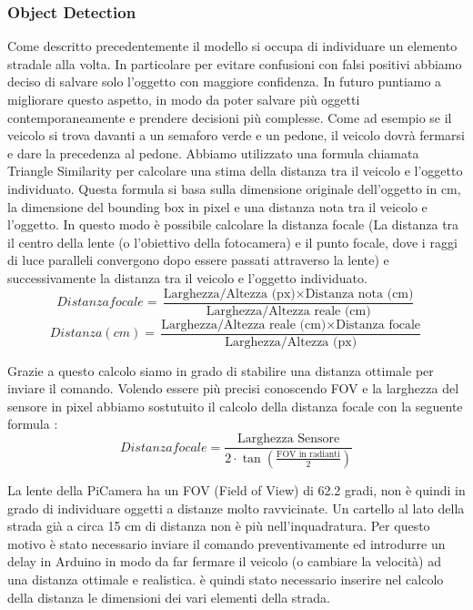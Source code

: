 \documentclass{article}
\begin{document}
    \subsubsection{Object Detection}
    Come descritto precedentemente il modello si occupa di individuare un elemento stradale alla volta. In particolare per evitare confusioni con falsi positivi abbiamo deciso di salvare solo l'oggetto con maggiore confidenza. In futuro puntiamo a migliorare questo aspetto, in modo da poter salvare più oggetti contemporaneamente e prendere decisioni più complesse. Come ad esempio se il veicolo si trova davanti a un semaforo verde e un pedone, il veicolo dovrà fermarsi e dare la precedenza al pedone.
    Abbiamo utilizzato una formula chiamata \cite{distanza} Triangle Similarity per calcolare una stima della distanza tra il veicolo e l'oggetto individuato. Questa formula si basa sulla dimensione originale dell'oggetto in cm, la dimensione del bounding box in pixel e una distanza nota tra il veicolo e l'oggetto. In questo modo è possibile calcolare la distanza focale (La distanza tra il centro della lente (o l'obiettivo della fotocamera) e il punto focale, dove i raggi di luce paralleli convergono dopo essere passati attraverso la lente) e successivamente la distanza tra il veicolo e l'oggetto individuato.  
    \[
    Distanza focale = \frac{\text{Larghezza/Altezza (px)} \times \text{Distanza nota (cm)}}{\text{Larghezza/Altezza reale (cm)}}
    \]
    \[
    Distanza (cm) = \frac{\text{Larghezza/Altezza reale (cm)} \times \text{Distanza focale}}{\text{Larghezza/Altezza (px)}}
    \]

    Grazie a questo calcolo siamo in grado di stabilire una distanza ottimale per inviare il comando. Volendo essere più precisi conoscendo FOV e la larghezza del sensore in pixel abbiamo sostutuito il calcolo della distanza focale con la seguente formula \cite{focallenght}:
    \[
    Distanza focale = \frac{\text{Larghezza Sensore}}{2 \cdot \tan\left( \frac{\text{FOV in radianti}}{2} \right)}
    \]

    La lente della PiCamera ha un FOV (Field of View) di 62.2 gradi, non è quindi in grado di individuare oggetti a distanze molto ravvicinate. Un cartello al lato della strada già a circa 15 cm di distanza non è più nell'inquadratura. Per questo motivo è stato necessario inviare il comando preventivamente ed introdurre un delay in Arduino in modo da far fermare il veicolo (o cambiare la velocità) ad una distanza ottimale e realistica. 
    è quindi stato necessario inserire nel calcolo della distanza le dimensioni dei vari elementi della strada.    
\end{document}

